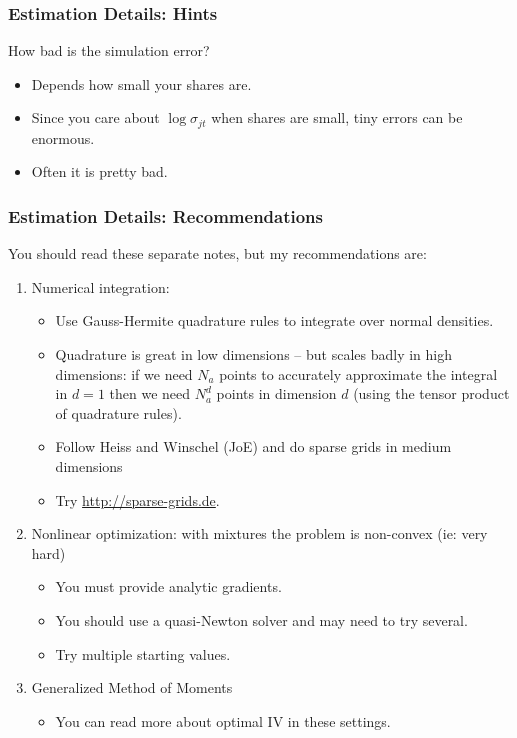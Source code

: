 \documentclass[aspectratio=169,11pt]{beamer}
\begin{document}
\begin{frame}
\frametitle{Estimation Details: Hints}
 How bad is the simulation error?
 \begin{itemize}
\item Depends how small your shares are. 
\item Since you care about $\log \sigma_{jt}$ when shares are small, tiny errors can be enormous.
\item Often it is pretty bad.
 \end{itemize}
\end{frame}

\begin{frame}
\frametitle{Estimation Details: Recommendations}
You should read these separate notes, but my recommendations are:
\begin{enumerate}
\item Numerical integration: 
\begin{itemize}
\item Use Gauss-Hermite quadrature rules to integrate over normal densities.
\item Quadrature is great in low dimensions -- but scales badly in high dimensions: if we need $N_a$ points to accurately approximate the integral in $d=1$ then we need $N_a^d$ points in dimension $d$ (using the tensor product of quadrature rules).
\item Follow Heiss and Winschel (JoE) and do \alert{sparse grids} in medium dimensions \item Try \url{http://sparse-grids.de}.
\end{itemize}
\item Nonlinear optimization: with mixtures the problem is non-convex (ie: very hard)
\begin{itemize}
\item You \alert{must} provide analytic gradients.
\item You should use a quasi-Newton solver and may need to try several.
\item Try multiple starting values.
\end{itemize}
\item Generalized Method of Moments
\begin{itemize}
\item You can read more about optimal IV in these settings.
\end{itemize}
\end{enumerate}
\end{frame}
\end{document}
